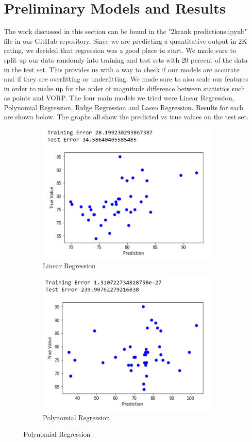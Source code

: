\documentclass{article}
\begin{document}
\section{Preliminary Models and Results}
The work discussed in this section can be found in the "2krank predictions.ipynb" file in our GitHub repository. Since we are predicting a quantitative output in 2K rating, we decided that regression was a good place to start. We made sure to split up our data randomly into training and test sets with 20 percent of the data in the test set. This provides us with a way to check if our models are accurate and if they are overfitting or underfitting. We made sure to also scale our features in order to make up for the order of magnitude difference between statistics such as points and VORP. The four main models we tried were Linear Regression, Polynomial Regression, Ridge Regression and Lasso Regression. Results for each are shown below. The graphs all show the predicted vs true values on the test set.
\begin{figure}[h]
\begin{subfigure}{0.5\textwidth}
\includegraphics[width=0.9\linewidth]{nbalinreg.png} 
\caption{Linear Regression}
\end{subfigure}
\begin{subfigure}{0.5\textwidth}
\includegraphics[width=0.9\linewidth]{nbapolyreg.png}
\caption{Polynomial Regression}
\end{subfigure}
\end{figure}
\end{document}
